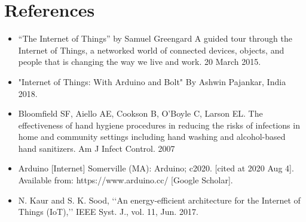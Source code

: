 \newpage
\thispagestyle{empty}

\chapter{References}

\begin{itemize}
	\item { “The Internet of Things” by Samuel Greengard A guided tour through the Internet of Things, a networked world of connected devices, objects, and people that is changing the way we live and work. 20 March 2015.}
	\item { "Internet of Things: With Arduino and Bolt" By Ashwin Pajankar, India 2018.}
	\item { Bloomfield SF, Aiello AE, Cookson B, O’Boyle C, Larson EL. The effectiveness of hand hygiene procedures in reducing the risks of infections in home and community settings including hand washing and alcohol-based hand sanitizers. Am J Infect Control. 2007}
	\item { Arduino [Internet] Somerville (MA): Arduino; c2020. [cited at 2020 Aug 4]. Available from: https://www.arduino.cc/ [Google Scholar].}
	\item { N. Kaur and S. K. Sood, ‘‘An energy-efficient architecture for the Internet of Things (IoT),’’ IEEE Syst. J., vol. 11, Jun. 2017.
}
	
\end{itemize}


	
	
